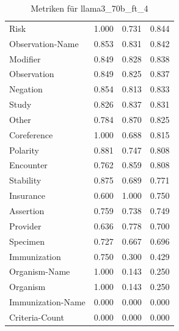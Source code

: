 \begin{table}[htbp]
\begin{tabular}{p{5cm}ccc}
Risk & 1.000 & 0.731 & 0.844 \\
Observation-Name & 0.853 & 0.831 & 0.842 \\
Modifier & 0.849 & 0.828 & 0.838 \\
Observation & 0.849 & 0.825 & 0.837 \\
Negation & 0.854 & 0.813 & 0.833 \\
Study & 0.826 & 0.837 & 0.831 \\
Other & 0.784 & 0.870 & 0.825 \\
Coreference & 1.000 & 0.688 & 0.815 \\
Polarity & 0.881 & 0.747 & 0.808 \\
Encounter & 0.762 & 0.859 & 0.808 \\
Stability & 0.875 & 0.689 & 0.771 \\
Insurance & 0.600 & 1.000 & 0.750 \\
Assertion & 0.759 & 0.738 & 0.749 \\
Provider & 0.636 & 0.778 & 0.700 \\
Specimen & 0.727 & 0.667 & 0.696 \\
Immunization & 0.750 & 0.300 & 0.429 \\
Organism-Name & 1.000 & 0.143 & 0.250 \\
Organism & 1.000 & 0.143 & 0.250 \\
Immunization-Name & 0.000 & 0.000 & 0.000 \\
Criteria-Count & 0.000 & 0.000 & 0.000 \\
\bottomrule
\end{tabular}
\caption{Metriken für llama3_70b_ft_4}
\label{tab:metrics_llama3_70b_ft_4}
\end{table}